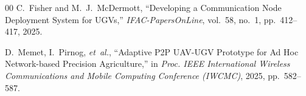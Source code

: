 \documentclass[conference]{IEEEtran}
\begin{document}
\begin{thebibliography}{00}
C.~Fisher and M.~J.~McDermott, ``Developing a Communication Node Deployment System for UGVs,'' \textit{IFAC-PapersOnLine}, vol.~58, no.~1, pp.~412--417, 2025.

D.~Memet, I.~Pirnog, \textit{et~al.}, ``Adaptive P2P UAV-UGV Prototype for Ad Hoc Network-based Precision Agriculture,'' in \textit{Proc. IEEE International Wireless Communications and Mobile Computing Conference (IWCMC)}, 2025, pp.~582--587.

\end{thebibliography}
\end{document}
